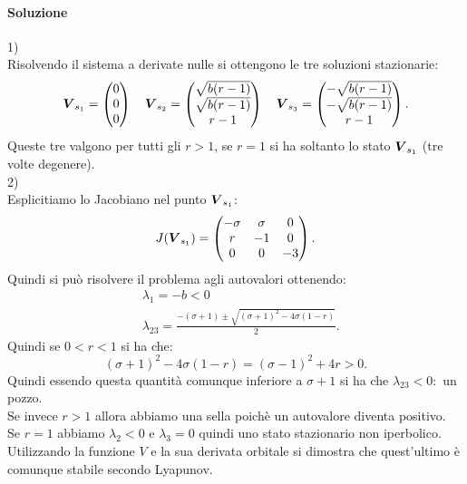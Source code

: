 \paragraph{Soluzione}%
1)\\
Risolvendo il sistema a derivate nulle si ottengono le tre soluzioni stazionarie:
\[
    \boldsymbol{V}_{s_1}= \begin{pmatrix} 0 \\ 0 \\ 0\end{pmatrix} \quad 
    \boldsymbol{V}_{s_2}= \begin{pmatrix} \sqrt{b(r-1)}  \\ \sqrt{b(r-1)} \\ r-1 \end{pmatrix} \quad 
    \boldsymbol{V}_{s_3}= \begin{pmatrix} -\sqrt{b(r-1)} \\ -\sqrt{b(r-1)} \\ r-1 \end{pmatrix} 
.\] 
Queste tre valgono per tutti gli $r > 1$, se $r = 1$ si ha soltanto lo stato $\boldsymbol{V}_{s_1}$ (tre volte degenere).\\
2)\\
Esplicitiamo lo Jacobiano nel punto $\boldsymbol{V}_{s_1}$:
\[
    J(\boldsymbol{V}_{s_1}) =
    \begin{pmatrix}
        -\sigma & \sigma & 0 \\
        r & -1 & 0 \\
        0 & 0 & -3 \\
    \end{pmatrix}
.\] 
Quindi si può risolvere il problema agli autovalori ottenendo:
\[\begin{aligned}
    & \lambda_1 = - b < 0\\
    & \lambda_{23} = \frac{- (\sigma +1) \pm \sqrt{(\sigma + 1)^2 - 4 \sigma (1-r)}}{2}
.\end{aligned}\]
Quindi se $0<r<1$ si ha che:
\[
    (\sigma + 1)^2 - 4 \sigma (1-r) = (\sigma-1)^2 + 4r >0
.\] 
Quindi essendo questa quantità comunque inferiore a $\sigma + 1$ si ha che $\lambda_{23} < 0:$ un pozzo.\\
Se invece $r>1$ allora abbiamo una sella poichè un autovalore diventa positivo.\\
Se $r=1$ abbiamo $\lambda_2 < 0$ e $\lambda_3 = 0$ quindi uno stato stazionario non iperbolico.\\
Utilizzando la funzione $V$ e la sua derivata orbitale si dimostra che quest'ultimo è comunque stabile secondo Lyapunov.
